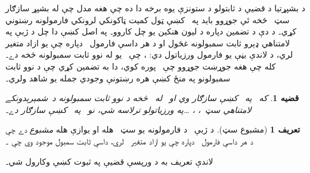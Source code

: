 \documentclass[12pt,a4paper,oneside]{report}
\newcommand{\olfileid}[3]{\gdef\pspart{#1}\gdef\pschapter{#2}\gdef\pssection{#3}}
\gdef\pspart{#2}\gdef\pschapter{#3}\gdef\pssection{}%
\newcommand{\ollabel}[1]{\label{\pspart:\pschapter:\pssection:#1}}
\newtheorem{prop}[thm]{قضيه}
\theoremstyle{definition}
\newtheorem{defn}[thm]{تعريف}
\newenvironment{explain}{}{}
\begin{document}
\label{olpseg:OLP-0130-B004:start}
\olfileid{fol}{com}{hen}
\label{olpseg:OLP-0130-B004:end}

\label{olpseg:OLP-0130-B005:start}
\label{olpseg:OLP-0130-B005:end}

\label{olpseg:OLP-0130-B006:start}
\begin{explain}
د بشپړتيا د قضيې د ثابتولو د ستونزې يوه برخه دا ده چې هغه مدل چې
له بشپړ سازګار سټ~\LR{$\Gamma$} څخه ئې جوړوو بايد په~\LR{$\Gamma$} کښې ټول
کميت ټاکونکي لرونکي فارمولونه رښتوني کړي۔ د دې د تضمين دپاره د
ليون هنکين يو چل کاروو۔ په اصل کښې دا چل د ژبې په لامتناهي ډېرو
ثابت سمبولونه غځول او د هر داسې فارمول~ دپاره چې يو
ازاد متغير لري، د لاندې بڼې يو فارمول ورزياتول دي:
،
چې~ يو له نوو ثابت سمبولونه څخه دے۔ کله چې هغه جوړښت
جوړوو چې~\LR{$\Gamma$} پوره کوي، دا به تضمين کړي چې د نوو ثابت سمبولونو
په منځ کښې هره
رښتونې وجودي جمله يو شاهد ولري۔
\end{explain}
\label{olpseg:OLP-0130-B006:end}

\label{olpseg:OLP-0130-B007:start}
\begin{prop}
\ollabel{prop:lang-exp}
که~\LR{$\Gamma$} په~ کښې سازګار وي او~ له~
څخه د نوو ثابت سمبولونه د~شمېرېدونکے لامتناهي سټ~،
، \dots په ورزياتولو ترلاسه شي، نو~\LR{$\Gamma$} په~
کښې سازګار دے۔
\end{prop}
\label{olpseg:OLP-0130-B007:end}

\label{olpseg:OLP-0130-B008:start}
\begin{defn}[مشبوع سټ]
د ژبې~ د فارمولونه يو سټ~\LR{$\Gamma$} هله او يوازې هله
\emph{مشبوع} دے چې د هر داسې فارمول~
دپاره چې يو ازاد متغير~ لري، داسې ثابت سمبول
 موجود وي چې
۔
\end{defn}
\label{olpseg:OLP-0130-B008:end}

\label{olpseg:OLP-0130-B009:start}
لاندې تعريف به د ورپسې قضيې په ثبوت کښې وکارول شي۔
\label{olpseg:OLP-0130-B009:end}
\end{document}
